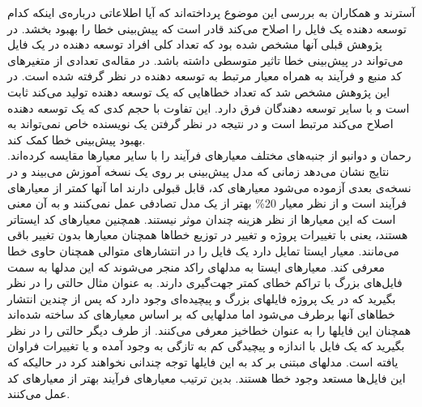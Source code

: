 آسترند و همکاران به بررسی این موضوع پرداخته‌اند که آیا اطلاعاتی درباره‌ی اینکه کدام توسعه دهنده یک فایل را اصلاح می‌کند قادر است که پیش‌بینی خطا را بهبود بخشد. در پژوهش قبلی آنها\cite{weyuker2008too} مشخص شده بود که تعداد کلی   افراد توسعه دهنده در یک فایل می‌تواند در پیش‌بینی خطا تاثیر متوسطی داشته باشد. در  مقاله‌ی \cite{ostrand2010programmer}  تعدادی از متغیرهای کد منبع و فرآیند به همراه معیار مرتبط به توسعه دهنده در نظر گرفته شده است.  در این پژوهش مشخص شد  که تعداد خطاهایی که یک توسعه دهنده تولید می‌کند ثابت است و با سایر توسعه دهندگان فرق دارد. این تفاوت با  حجم کدی که یک توسعه دهنده اصلاح می‌کند مرتبط است و در نتیجه در نظر گرفتن یک نویسنده خاص نمی‌تواند به بهبود پیش‌بینی خطا کمک کند\cite{ostrand2010programmer}. \\

رحمان و دوانبو از جنبه‌های مختلف معیارهای فرآیند  را با سایر معیارها مقایسه کرده‌اند\cite{rahman2013and}. نتایج نشان می‌دهد  زمانی که مدل پیش‌بینی بر روی یک نسخه آموزش می‌بیند و در نسخه‌ی بعدی آزموده می‌شود معیارهای کد،  قابل قبولی دارند اما    آنها کمتر از معیارهای فرآیند است  و از نظر معیار 20\% 
بهتر از یک مدل تصادفی عمل نمی‌کنند و  به آن معنی است که این معیارها از نظر هزینه چندان  موثر نیستند. همچنین معیارهای کد ایستاتر هستند، ‌یعنی با تغییرات پروژه و تغییر در توزیع خطاها همچنان معیارها بدون تغییر باقی می‌مانند. معیار ایستا تمایل دارد یک فایل را در انتشارهای متوالی همچنان حاوی خطا معرفی کند. معیارهای ایستا به مدلهای راکد منجر می‌شوند که این مدلها به سمت فایل‌های بزرگ با تراکم خطای کمتر جهت‌گیری دارند. به عنوان مثال حالتی را در نظر بگیرید که در یک پروژه فایلهای بزرگ و پیچیده‌ای وجود دارد که پس از چندین انتشار خطاهای آنها برطرف می‌شود اما مدلهایی که بر اساس معیارهای کد ساخته شده‌اند همچنان این فایلها را به عنوان خطا‌خیز معرفی می‌کنند. از طرف دیگر حالتی را در نظر بگیرید که یک فایل با اندازه و پیچیدگی کم به تازگی به وجود آمده و یا تغییرات فراوان یافته است. مدلهای مبتنی بر کد به این فایلها توجه چندانی نخواهند کرد در حالیکه که این فایل‌ها مستعد وجود خطا هستند. بدین ترتیب معیارهای فرآیند بهتر از معیارهای کد عمل می‌کنند. 
 
 
